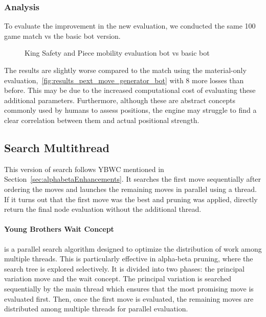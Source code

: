 \subsubsection{Analysis}

To evaluate the improvement in the new evaluation, we conducted the same 100 game match vs the basic bot version.

\vspace{1em}

\begin{center}
    \begin{figure}[H]
        \centering
        \caption{King Safety and Piece mobility evaluation bot vs basic bot}
        \label{fig:results_safety_mobility_bot}
    \end{figure}
\medskip
\end{center}

\noindent The results are slightly worse compared to the match using the material-only evaluation,~\ref{fig:results_pext_move_generator_bot} with 8 more losses than before. This may be due to the increased computational cost of evaluating these additional parameters. Furthermore, although these are abstract concepts commonly used by humans to assess positions, the engine may struggle to find a clear correlation between them and actual positional strength.

\subsection{Search Multithread}

This version of search follows YBWC mentioned in Section~\ref{sec:alphabetaEnhancements}. It searches the first move sequentially after ordering the moves and launches the remaining moves in parallel using a thread. If it turns out that the first move was the best and pruning was applied, directly return the final node evaluation without the additional thread.

\paragraph{Young Brothers Wait Concept} is a parallel search algorithm designed to optimize the distribution of work among multiple threads. This is particularly effective in alpha-beta pruning, where the search tree is explored selectively. It is divided into two phases: the principal variation move and the wait concept. The principal variation is searched sequentially by the main thread which ensures that the most promising move is evaluated first. Then, once the first move is evaluated, the remaining moves are distributed among multiple threads for parallel evaluation.

